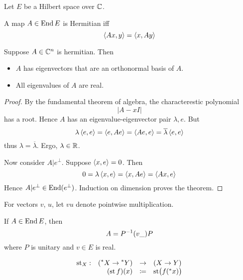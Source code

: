 \documentclass{scrartcl}
\newcommand{\conj}[1]{\overline{#1}}
\newcommand{\hyper}[1]{\prescript{*}{}{#1}}
\renewcommand{\define}{\coloneqq}
\DeclareMathOperator{\st}{st}
\begin{document}
Let $E$ be a Hilbert space over $\mathbb{C}$. 
\begin{defn}[Hermitian]
  A map $A\in \operatorname{End}{E}$ is Hermitian iff
  \[
    \left\langle Ax, y \right\rangle=\left\langle x, Ay \right\rangle
  \]
\end{defn}
\begin{theorem}
  \label{finite-spectral-theorem}
  Suppose $A\in  \mathbb{C}^n$ is hermitian. Then
  \begin{itemize}
  \item $A$ has eigenvectors that are an orthonormal basis of $A$.
  \item All eigenvalues of $A$ are real. 
  \end{itemize}

\end{theorem}
\begin{proof}
  \renewcommand{\vec}{}
  By the fundamental theorem of algebra, the characterestic polynomial
  \[
    |A-xI|
  \]
  has a root. Hence $A$ has an eigenvalue-eigenvector pair $\lambda, \vec e$. But
  \[
    \lambda \inner{\vec e}{\vec e}=\inner{\vec e}{A \vec e}=\inner{A\vec e}{\vec e}=\conj\lambda \inner{\vec e}{\vec e}
  \]
  thus $\lambda = \conj\lambda$. Ergo, $\lambda\in \mathbb{R}$. 

  Now consider $A|e^\perp$. Suppose $\left\langle x, e \right\rangle=0$. Then 
  \[
    0=\lambda\left\langle x, e \right\rangle=\left\langle x, Ae \right\rangle=\left\langle Ax, e \right\rangle
  \]
  Hence $A|e^\perp\in\operatorname{End}(e^\perp)$. Induction on dimension proves the theorem. 
\end{proof}

For vectors $v$, $u$, let $vu$ denote pointwise multiplication. 
\begin{cor}[diagonalization]
  \label{thm:diag}
  If $A\in\operatorname{End} E$, then 
  \[
    A=P^{-1}(v\_)P\\
  \]
  where $P$ is unitary and $v\in E$ is real.
\end{cor}

\begin{defn}
  \[
  \begin{array}{lrll}
   \st_X: &(\hyper X \to \hyper Y) &\to& (X \to Y) \\
    &(\st f)(x) &\define& \st\bigl( f(\hyper x)\bigr)
  \end{array}
  \]
\end{defn}
\end{document}
